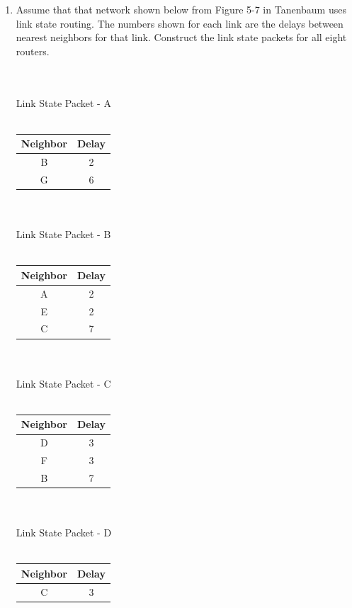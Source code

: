 \documentclass[12pt]{article}
\begin{document}
\begin{enumerate}
\newpage 

\item Assume that that network shown below from Figure 5-7 in Tanenbaum uses link state routing.  The numbers shown for each link are the delays between nearest neighbors for that link.  Construct the link state packets for all eight routers. 
  \begin{center}
    ~\\ ~\\ Link State Packet - A \\ ~\\
    \begin{tabular}{|c|c|}
      \hline
      Neighbor & Delay \\
      \hline
      B & 2 \\
      \hline
      G & 6 \\
      \hline
    \end{tabular} 
    ~\\ ~\\ Link State Packet - B \\ ~\\
    \begin{tabular}{|c|c|}
      \hline
      Neighbor & Delay \\
      \hline
      A & 2 \\
      \hline
      E & 2 \\
      \hline
      C & 7 \\
      \hline
    \end{tabular} 
    ~\\ ~\\ Link State Packet - C \\ ~\\
    \begin{tabular}{|c|c|}
      \hline
      Neighbor & Delay \\
      \hline
      D & 3 \\
      \hline
      F & 3 \\
      \hline
      B & 7 \\
      \hline
    \end{tabular} 
    ~\\ ~\\ Link State Packet - D \\ ~\\
    \begin{tabular}{|c|c|}
      \hline
      Neighbor & Delay \\
      \hline
      C & 3 \\

\end{tabular}
\end{center}
\end{enumerate}
\end{document}
